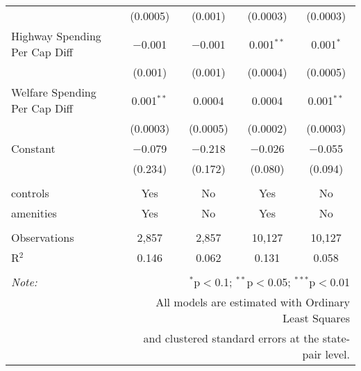 \begin{table}[!htbp]
\begin{tabular}{@{\extracolsep{5pt}}lcccc}
  & (0.0005) & (0.001) & (0.0003) & (0.0003) \\ 
  Highway Spending Per Cap Diff & $-$0.001 & $-$0.001 & 0.001$^{**}$ & 0.001$^{*}$ \\ 
  & (0.001) & (0.001) & (0.0004) & (0.0005) \\ 
  Welfare Spending Per Cap Diff & 0.001$^{**}$ & 0.0004 & 0.0004 & 0.001$^{**}$ \\ 
  & (0.0003) & (0.0005) & (0.0002) & (0.0003) \\ 
  Constant & $-$0.079 & $-$0.218 & $-$0.026 & $-$0.055 \\ 
  & (0.234) & (0.172) & (0.080) & (0.094) \\ 
 \hline \\[-1.8ex] 
controls & Yes & No & Yes & No \\ 
amenities & Yes & No & Yes & No \\ 
\hline \\[-1.8ex] 
Observations & 2,857 & 2,857 & 10,127 & 10,127 \\ 
R$^{2}$ & 0.146 & 0.062 & 0.131 & 0.058 \\ 
\hline 
\hline \\[-1.8ex] 
\textit{Note:}  & \multicolumn{4}{r}{$^{*}$p$<$0.1; $^{**}$p$<$0.05; $^{***}$p$<$0.01} \\ 
 & \multicolumn{4}{r}{All models are estimated with Ordinary Least Squares} \\ 
 & \multicolumn{4}{r}{and clustered standard errors at the state-pair level.} \\ 
\end{tabular} 
\end{table} 

